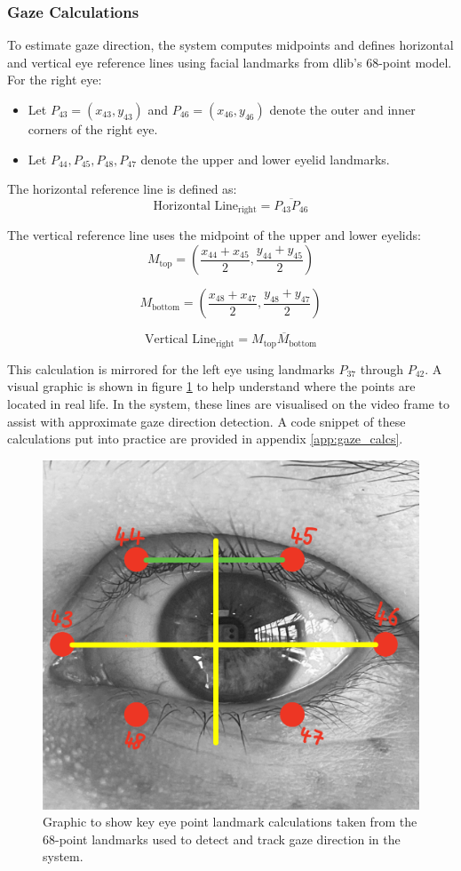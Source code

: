 \documentclass[12pt]{article}
\theoremstyle{plain}
\theoremstyle{definition}
\begin{document}
\subsubsection{Gaze Calculations}

To estimate gaze direction, the system computes midpoints and defines horizontal and vertical eye reference lines using facial landmarks from dlib's 68-point model. For the right eye:

\begin{itemize}

    \item Let \( P_{43} = (x_{43}, y_{43}) \) and \( P_{46} = (x_{46}, y_{46}) \) denote the outer and inner corners of the right eye.

    \item Let \( P_{44}, P_{45}, P_{48}, P_{47} \) denote the upper and lower eyelid landmarks.

\end{itemize}
The horizontal reference line is defined as:
\[
\text{Horizontal Line}_{\text{right}} = \overline{P_{43}P_{46}}
\]

The vertical reference line uses the midpoint of the upper and lower eyelids:
\[
M_{\text{top}} = \left( \frac{x_{44} + x_{45}}{2}, \frac{y_{44} + y_{45}}{2} \right)
\]

\[
M_{\text{bottom}} = \left( \frac{x_{48} + x_{47}}{2}, \frac{y_{48} + y_{47}}{2} \right)
\]

\[
\text{Vertical Line}_{\text{right}} = \overline{M_{\text{top}}M_{\text{bottom}}}
\]

This calculation is mirrored for the left eye using landmarks \( P_{37} \) through \( P_{42} \). A visual graphic is shown in figure \ref{fig:eye_calc} to help understand where the points are located in real life. In the system, these lines are visualised on the video frame to assist with approximate gaze direction detection. A code snippet of these calculations put into practice are provided in appendix \ref{app:gaze_calcs}.


\begin{figure}[h!]
    \centering
    \includegraphics[width=0.6\linewidth]{img/Eye_calc.jpg}
    \caption{Graphic to show key eye point landmark calculations taken from the 68-point landmarks used to detect and track gaze direction in the system.}
    \label{fig:eye_calc}
\end{figure}
\end{document}
